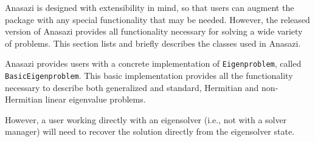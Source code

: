 \documentclass[acmtoms]{acmtrans2m}
\newcommand{\aspace}[1]{\texttt{#1}}
\begin{document}
Anasazi is designed with extensibility in mind, so that users can
augment the package with any special functionality that may be
needed. However, the released version of Anasazi provides all
functionality necessary for solving a wide variety of problems. This
section lists and briefly describes the classes used in Anasazi.

Anasazi provides users with a concrete implementation of
\aspace{Eigenproblem}, called \aspace{BasicEigenproblem}. This basic implementation
provides all the functionality necessary to describe both generalized and standard,
Hermitian and non-Hermitian linear eigenvalue problems.

However, a user working
directly with an eigensolver (i.e., not with a solver manager) will need to recover the
solution directly from the eigensolver state.





\end{document}
